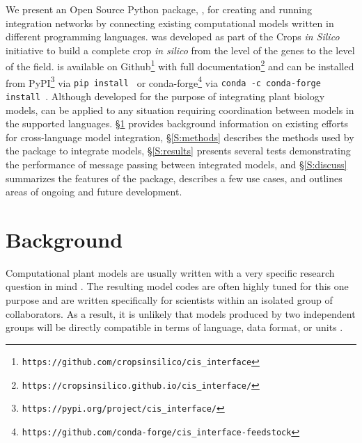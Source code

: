 \documentclass[journal]{IEEEtran}
\newcommand{\todo}[1]{{\color{red}{#1}}}
\newcommand{\pkg}{{\tt \todo{cis\_interface}}{}}
\begin{document}
We present an Open Source Python package, {\pkg}, for creating and running integration networks by connecting existing computational models written in different programming languages. {\pkg} was developed as part of the Crops \emph{in Silico} \citep{Marshall-Colon2017} initiative to build a complete crop \emph{in silico} from the level of the genes to the level of the field. {\pkg} is available on Github\footnote{{\tt https://github.com/cropsinsilico/cis\_interface}} with full documentation\footnote{{\tt https://cropsinsilico.github.io/cis\_interface/}} and can be installed from PyPI\footnote{{\tt https://pypi.org/project/cis\_interface/}} via {\tt pip install {\pkg}} or conda-forge\footnote{{\tt https://github.com/conda-forge/cis\_interface-feedstock}} via {\tt conda -c conda-forge install {\pkg}}. Although developed for the purpose of integrating plant biology models, {\pkg} can be applied to any situation requiring coordination between models in the supported languages. \S\ref{S:background} provides background information on existing efforts for cross-language model integration, \S\ref{S:methods} describes the methods used by the {\pkg} package to integrate models, \S\ref{S:results} presents several tests demonstrating the performance of message passing between integrated models, and \S\ref{S:discuss} summarizes the features of the {\pkg} package, describes a few use cases, and outlines areas of ongoing and future development.

\section{Background}\label{S:background}
%
Computational plant models are usually written with a very specific research question in mind \citep[e.g. describing a specific metabolic pathway in C4 photosynthesis,][]{Wang2014}. The resulting model codes are often highly tuned for this one purpose and are written specifically for scientists within an isolated group of collaborators. As a result, it is unlikely that models produced by two independent groups will be directly compatible in terms of language, data format, or units \citep{Marshall-Colon2017}. 
\end{document}
